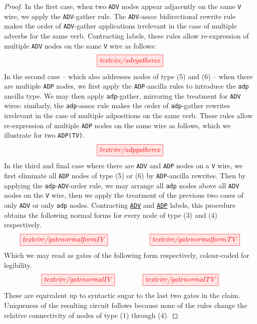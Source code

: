 \begin{lemma}
\begin{proof}
In the first case, when two \texttt{ADV} nodes appear adjacently on the same \texttt{V} wire, we apply the \texttt{ADV}-gather rule. The \texttt{ADV}-assoc bidirectional rewrite rule makes the order of \texttt{ADV}-gather applications irrelevant in the case of multiple adverbs for the same verb. Contracting labels, these rules allow re-expression of multiple \texttt{ADV} nodes on the same \texttt{V} wire as follows:
\[\tikzfig{textcirc/advgatherex}\]
In the second case -- which also addresses nodes of type (5) and (6) -- when there are multiple \texttt{ADP} nodes, we first apply the \texttt{ADP}-ancilla rules to introduce the \texttt{adp} ancilla type. We may then apply \texttt{adp}-gather, mirroring the treatment for \texttt{ADV} wires: similarly, the \texttt{adp}-assoc rule makes the order of \texttt{adp}-gather rewrites irrelevant in the case of multiple adpositions on the same verb. These rules allow re-expression of multiple \texttt{ADP} nodes on the same wire as follows, which we illustrate for two \texttt{ADP(TV)}.
\[\tikzfig{textcirc/adpgatherex}\]
In the third and final case where there are \texttt{ADV} and \texttt{ADP} nodes on a \texttt{V} wire, we first eliminate all \texttt{ADP} nodes of type (5) or (6) by \texttt{ADP}-ancilla rewrites. Then by applying the \texttt{adp}-\texttt{ADV}-order rule, we may arrange all \texttt{adp} nodes above all \texttt{ADV} nodes on the \texttt{V} wire, then we apply the treatment of the previous two cases of only \texttt{ADV} or only \texttt{adp} nodes.
Contracting \texttt{\underline{ADV}} and \texttt{\underline{ADP}} labels, this procedure obtains the following normal forms for every node of type (3) and (4) respectively.
\[\tikzfig{textcirc/gatenormalformIV} \qquad\qquad\qquad \tikzfig{textcirc/gatenormalformTV}\]
Which we may read as gates of the following form respectively, colour-coded for legibility.
\[\tikzfig{textcirc/gatenormalIV} \quad\quad\quad\quad \tikzfig{textcirc/gatenormalTV}\]
These are equivalent up to syntactic sugar to the last two gates in the claim. Uniqueness of the resulting circuit follows because none of the rules change the relative connectivity of nodes of type (1) through (4).
\end{proof}
\end{lemma}

